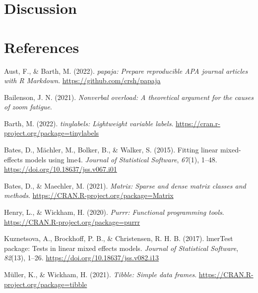 \documentclass[
  english,
  man]{apa7}
\newlength{\cslhangindent}
\newlength{\cslentryspacingunit} %
\newenvironment{CSLReferences}[2] %
 {%
  \setlength{\parindent}{0pt}
  \ifodd #1
  \let\oldpar\par
  \def\par{\hangindent=\cslhangindent\oldpar}
  \fi
  \setlength{\parskip}{#2\cslentryspacingunit}
 }%
 {}
\begin{document}
\hypertarget{discussion}{%
\section{Discussion}\label{discussion}}

\newpage

\hypertarget{references}{%
\section{References}\label{references}}

\hypertarget{refs}{}
\begin{CSLReferences}{1}{0}
\leavevmode{}%
Aust, F., \& Barth, M. (2022). \emph{{papaja}: {Prepare} reproducible {APA} journal articles with {R Markdown}}. \url{https://github.com/crsh/papaja}

\leavevmode{}%
Bailenson, J. N. (2021). \emph{Nonverbal overload: A theoretical argument for the causes of zoom fatigue}.

\leavevmode{}%
Barth, M. (2022). \emph{{tinylabels}: Lightweight variable labels}. \url{https://cran.r-project.org/package=tinylabels}

\leavevmode{}%
Bates, D., Mächler, M., Bolker, B., \& Walker, S. (2015). Fitting linear mixed-effects models using {lme4}. \emph{Journal of Statistical Software}, \emph{67}(1), 1--48. \url{https://doi.org/10.18637/jss.v067.i01}

\leavevmode{}%
Bates, D., \& Maechler, M. (2021). \emph{Matrix: Sparse and dense matrix classes and methods}. \url{https://CRAN.R-project.org/package=Matrix}

\leavevmode{}%
Henry, L., \& Wickham, H. (2020). \emph{Purrr: Functional programming tools}. \url{https://CRAN.R-project.org/package=purrr}

\leavevmode{}%
Kuznetsova, A., Brockhoff, P. B., \& Christensen, R. H. B. (2017). {lmerTest} package: Tests in linear mixed effects models. \emph{Journal of Statistical Software}, \emph{82}(13), 1--26. \url{https://doi.org/10.18637/jss.v082.i13}

\leavevmode{}%
Müller, K., \& Wickham, H. (2021). \emph{Tibble: Simple data frames}. \url{https://CRAN.R-project.org/package=tibble}


\end{CSLReferences}
\end{document}
